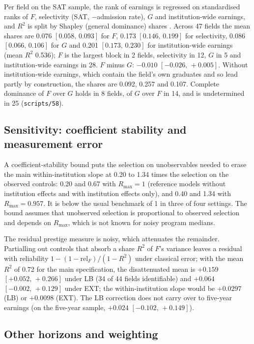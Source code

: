 \documentclass[11pt]{article}
\newcommand{\ci}[2]{$[#1,\allowbreak\,#2]$}
\newcommand{\scr}[1]{\texttt{scripts/#1}}
\begin{document}
Per field on the SAT sample, the rank of earnings is regressed on standardised ranks of $F$, selectivity (SAT,
$-$admission rate), $G$ and institution-wide earnings, and $R^2$ is split by Shapley (general dominance) shares
\citep{budescu1993dominance, gromping2007estimators, shorrocks2013decomposition}.
Across 47 fields the mean shares are 0.076 \ci{0.058}{0.093} for $F$, 0.173 \ci{0.146}{0.199} for selectivity, 0.086
\ci{0.066}{0.106} for $G$ and 0.201 \ci{0.173}{0.230} for institution-wide earnings (mean $R^2$ 0.536); $F$ is the
largest block in 2 fields, selectivity in 12, $G$ in 5 and institution-wide earnings in 28. $F$ minus $G$:
$-0.010$ \ci{-0.026}{+0.005}. Without institution-wide earnings, which contain the field's own graduates and so
lead partly by construction, the shares are 0.092, 0.257 and 0.107. Complete dominance of $F$ over $G$ holds in 8
fields, of $G$ over $F$ in 14, and is undetermined in 25 (\scr{58}).

\subsection{Sensitivity: coefficient stability and measurement error}\label{sec:oster}

A coefficient-stability bound \citep{oster2019unobservable} puts the selection on unobservables needed to erase
the main within-institution slope at 0.20 to 1.34 times the selection on the observed controls: 0.20 and 0.67
with $R_{\max}=1$ (reference models without institution effects and with institution effects only), and 0.40 and
1.34 with $R_{\max}=0.957$. It is below the usual benchmark of 1 in three of four settings. The bound assumes that
unobserved selection is proportional to observed selection and depends on $R_{\max}$, which is not known for noisy
program medians.

The residual prestige measure is noisy, which attenuates the remainder. Partialling out controls that absorb a
share $R^2$ of $F$'s variance leaves a residual with reliability $1-(1-\text{rel}_F)/(1-R^2)$ under classical
error; with the mean $R^2$ of 0.72 for the main specification, the disattenuated mean is $+0.159$
\ci{+0.052}{+0.266} under LB (34 of 44 fields identifiable) and $+0.064$ \ci{-0.002}{+0.129} under EXT; the
within-institution slope would be $+0.0297$ (LB) or $+0.0098$ (EXT). The LB correction does not carry over to
five-year earnings (on the five-year sample, $+0.024$ \ci{-0.102}{+0.149}).

\subsection{Other horizons and weighting}\label{sec:horizons}
\end{document}
